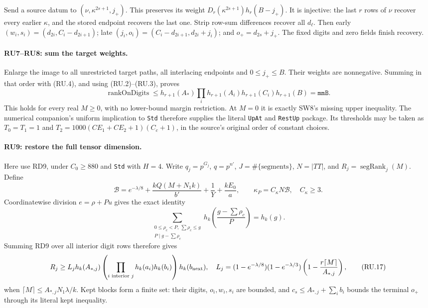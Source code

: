 \documentclass[11pt,a4paper]{article}
\numberwithin{equation}{section}
\theoremstyle{remark}\newtheorem{remark}[theorem]{Remark}
\begin{document}
Send a source datum to
$(\nu,\kappa^{2s+1},j_+)$.
This preserves its weight
$D_r(\kappa^{2s+1})h_r(B-j_+)$.
It is injective: the last $r$ rows of $\nu$ recover every earlier
$\kappa$, and the stored endpoint recovers the last one.
Strip row-sum differences recover all $d_\ell$. Then early
$(w_i,s_i)=(d_{2i},C_i-d_{2i+1})$; late
$(j_i,o_i)=(C_i-d_{2i+1},d_{2i}+j_i)$; and
$o_+=d_{2s}+j_+$. The fixed digits and zero fields finish recovery.

\paragraph{RU7--RU8: sum the target weights.}
Enlarge the image to all unrestricted target paths, all interlacing
endpoints and $0\le j_+\le B$. Their weights are nonnegative.
Summing in that order with (RU.4), and using (RU.2)--(RU.3), proves
\[
 \boxed{\operatorname{rankOnDigits}
 \le h_{r+1}(A_*)\prod_i h_{r+1}(A_i)h_{r+1}(C_i)
                         h_{r+1}(B)=\texttt{mmB}.}         \tag{RU.14}
\]
This holds for every real $M\ge0$, with no lower-bound margin
restriction. At $M=0$ it is exactly SW8's missing upper inequality.
The numerical companion's uniform implication to \texttt{Std}
therefore supplies the literal \texttt{UpAt} and \texttt{RestUp}
package. Its thresholds may be taken as
$T_0=T_1=1$ and
$T_2=1000(CE_1+CE_2+1)(C_c+1)$, in the source's original order of
constant choices.

\paragraph{RU9: restore the full tensor dimension.}
Here use RD9, under $C_0\ge880$ and \texttt{Std} with $H=4$.
Write $q_j=p^{G_j}$, $q=p^{n'}$, $J=\#\{\text{segments}\}$,
$N=|TT|$, and $R_j=\operatorname{segRank}_j(M)$. Define
\[
 \mathcal B=e^{-\lambda/8}
       +\frac{kQ(M+N_1k)}{b'}+\frac1Y+\frac{kE_0}{a},
 \qquad \kappa_P=C_\kappa N\mathcal B,\quad C_\kappa\ge3.
                                                               \tag{RU.15}
\]
Coordinatewise division $e=\rho+Pu$ gives the exact identity
\[
 \sum_{\substack{0\le\rho_c<P,\ \sum\rho_c\le g\\
                  P\mid g-\sum\rho_c}}
      h_k\!\left(\frac{g-\sum\rho_c}{P}\right)=h_k(g).
                                                               \tag{RU.16}
\]
Summing RD9 over all interior digit rows therefore gives
\[
 R_j\ge L_j h_k(A_{*,j})
       \left(\prod_{i\text{ interior }j}h_k(a_i)h_k(b_i)\right)
       h_k(b_{\rm next}),
 \quad
 L_j=(1-e^{-\lambda/8})(1-e^{-\lambda/3})
              \left(1-\frac{r\lceil M\rceil}{A_{*,j}}\right),
                                                               \tag{RU.17}
\]
when $\lceil M\rceil\le A_{*,j}N_1\lambda/k$.
Kept blocks form a finite set: their digits, $o_i,w_i,s_i$ are
bounded, and $c_s\le A_{*,j}+\sum_i b_i$ bounds the terminal
$o_+$ through its literal kept inequality.
\end{document}
